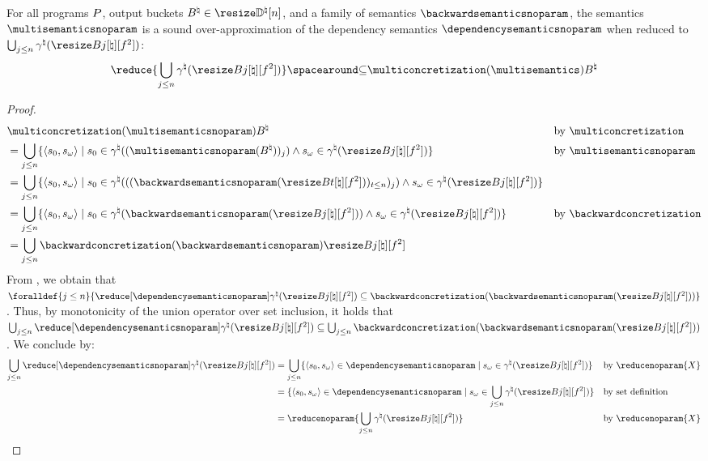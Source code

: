 \begin{lemma}
  For all programs $P$, output buckets $\buckets\in\vectorbuckets$, and a family of semantics $\backwardsemanticsnoparam$, the %
  semantics $\multisemanticsnoparam$ is a \textup{sound over-approximation} of the dependency semantics $\dependencysemanticsnoparam$ when reduced to $\bigsetjoin_{j\le n}\abstractdomainconcretization(\bucket)$:
  \[\reduce{\bigsetjoin_{j\le n}\abstractdomainconcretization(\bucket)} \SubseteQ \multiconcretization(\multisemantics)\buckets\]
\end{lemma}
\begin{proof}
\begin{align*}
  &\vphantom{=} \multiconcretization(\multisemanticsnoparam)\buckets
    && \text{by $\multiconcretization$} \\
  &= \bigsetjoin_{j \le n}\setdef{\inputoutputtuple{\defstate}}{\retrieveinput{\defstate}\in\abstractdomainconcretization((\multisemanticsnoparam(\buckets))_j)\land\retrieveoutput{\defstate}\in\abstractdomainconcretization(\bucket)}
    && \text{by $\multisemanticsnoparam$} \\
  &= \bigsetjoin_{j \le n} \setdef{\inputoutputtuple{\defstate}}{\retrieveinput{\defstate}\in\abstractdomainconcretization(((\backwardsemanticsnoparam(\bucket[t]))_{t\le n})_j)\land\retrieveoutput{\defstate}\in\abstractdomainconcretization(\bucket)}
  && \\
  &= \bigsetjoin_{j \le n} \setdef{\inputoutputtuple{\defstate}}{\retrieveinput{\defstate}\in\abstractdomainconcretization(\backwardsemanticsnoparam(\bucket))\land\retrieveoutput{\defstate}\in\abstractdomainconcretization(\bucket)}
  && \text{by $\backwardconcretization$} \\
  &= \bigsetjoin_{j \le n} \backwardconcretization(\backwardsemanticsnoparam)\bucket
\end{align*}
From , we obtain that $\foralldef{j \le n}{\reduceddependencysemanticsnoparam \subseteq \backwardconcretization(\backwardsemanticsnoparam(\bucket))}$.
Thus, by monotonicity of the union operator over set inclusion, it holds that $\bigsetjoin_{j\le n}\reduceddependencysemanticsnoparam \subseteq \bigsetjoin_{j\le n}\backwardconcretization(\backwardsemanticsnoparam(\bucket))$. We conclude by:
\begin{align*}
  \bigsetjoin_{j\le n}\reduceddependencysemanticsnoparam &= \bigsetjoin_{j\le n} \setdef{\inputoutputtuple{\defstate}\in\dependencysemanticsnoparam}{\retrieveoutput{\defstate}\in\abstractdomainconcretization(\bucket)}
    && \text{by $\reducenoparam{X}$} \\
  &= \setdef{\inputoutputtuple{\defstate}\in\dependencysemanticsnoparam}{\retrieveoutput{\defstate}\in\bigsetjoin_{j \le n}\abstractdomainconcretization(\bucket)}
    && \text{by set definition} \\
  &= \reducenoparam{\bigsetjoin_{j \le n}\abstractdomainconcretization(\bucket)}
    && \text{by $\reducenoparam{X}$}
\end{align*}
\end{proof}

